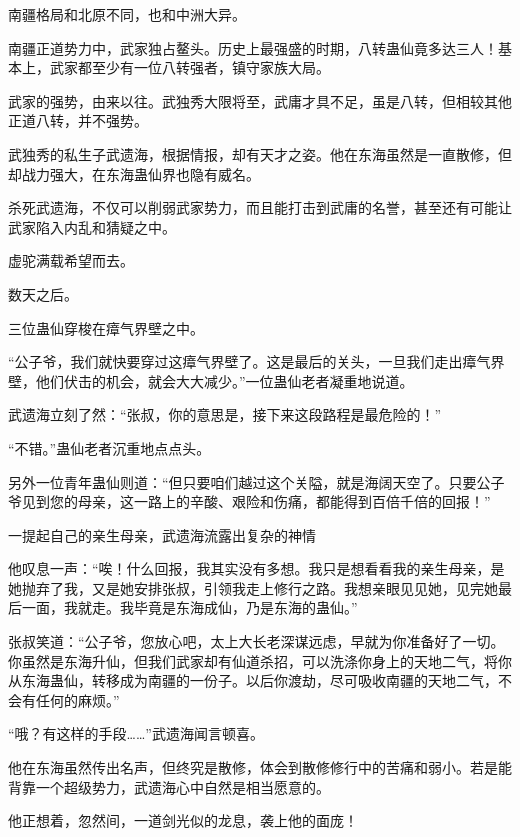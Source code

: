 \begin{this_body}
南疆格局和北原不同，也和中洲大异。

南疆正道势力中，武家独占鳌头。历史上最强盛的时期，八转蛊仙竟多达三人！基本上，武家都至少有一位八转强者，镇守家族大局。

武家的强势，由来以往。武独秀大限将至，武庸才具不足，虽是八转，但相较其他正道八转，并不强势。

武独秀的私生子武遗海，根据情报，却有天才之姿。他在东海虽然是一直散修，但却战力强大，在东海蛊仙界也隐有威名。

杀死武遗海，不仅可以削弱武家势力，而且能打击到武庸的名誉，甚至还有可能让武家陷入内乱和猜疑之中。

虚驼满载希望而去。

数天之后。

三位蛊仙穿梭在瘴气界壁之中。

“公子爷，我们就快要穿过这瘴气界壁了。这是最后的关头，一旦我们走出瘴气界壁，他们伏击的机会，就会大大减少。”一位蛊仙老者凝重地说道。

武遗海立刻了然：“张叔，你的意思是，接下来这段路程是最危险的！”

“不错。”蛊仙老者沉重地点点头。

另外一位青年蛊仙则道：“但只要咱们越过这个关隘，就是海阔天空了。只要公子爷见到您的母亲，这一路上的辛酸、艰险和伤痛，都能得到百倍千倍的回报！”

一提起自己的亲生母亲，武遗海流露出复杂的神情

他叹息一声：“唉！什么回报，我其实没有多想。我只是想看看我的亲生母亲，是她抛弃了我，又是她安排张叔，引领我走上修行之路。我想亲眼见见她，见完她最后一面，我就走。我毕竟是东海成仙，乃是东海的蛊仙。”

张叔笑道：“公子爷，您放心吧，太上大长老深谋远虑，早就为你准备好了一切。你虽然是东海升仙，但我们武家却有仙道杀招，可以洗涤你身上的天地二气，将你从东海蛊仙，转移成为南疆的一份子。以后你渡劫，尽可吸收南疆的天地二气，不会有任何的麻烦。”

“哦？有这样的手段……”武遗海闻言顿喜。

他在东海虽然传出名声，但终究是散修，体会到散修修行中的苦痛和弱小。若是能背靠一个超级势力，武遗海心中自然是相当愿意的。

他正想着，忽然间，一道剑光似的龙息，袭上他的面庞！

\end{this_body}

